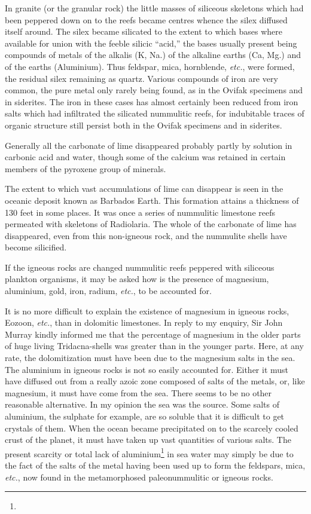 \documentclass[a4paper, 12pt, oneside]{article}
\begin{document}
In granite (or the granular rock) the little masses of siliceous skeletons which had been peppered down on to the reefs became centres whence the silex diffused itself around. The silex became silicated to the extent to which bases where available for union with the feeble silicic ``acid,'' the bases usually present being compounds of metals of the alkalis (K, Na.) of the alkaline earths (Ca, Mg.) and of the earths (Aluminium). Thus feldspar, mica, hornblende, \emph{etc.}, were formed, the residual silex remaining as quartz. Various compounds of iron are very common, the pure metal only rarely being found, as in the Ovifak specimens and in siderites. The iron in these cases has almost certainly been reduced from iron salts which had infiltrated the silicated nummulitic reefs, for indubitable traces of organic structure still persist both in the Ovifak specimens and in siderites.

Generally all the carbonate of lime disappeared probably partly by solution in carbonic acid and water, though some of the calcium was retained in certain members of the pyroxene group of minerals.

The extent to which vast accumulations of lime can disappear is seen in the oceanic deposit known as Barbados Earth. This formation attains a thickness of 130 feet in some places. It was once a series of nummulitic limestone reefs permeated with skeletons of Radiolaria. The whole of the carbonate of lime has disappeared, even from this non-igneous rock, and the nummulite shells have become silicified.

If the igneous rocks are changed nummulitic reefs peppered with siliceous plankton organisms, it may be asked how is the presence of magnesium, aluminium, gold, iron, radium, \emph{etc.}, to be accounted for.

It is no more difficult to explain the existence of magnesium in igneous rocks, Eozoon, \emph{etc.}, than in dolomitic limestones. In reply to my enquiry, Sir John Murray kindly informed me that the percentage of magnesium in the older parts of huge living Tridacna-shells was greater than in the younger parts. Here, at any rate, the dolomitization must have been due to the magnesium salts in the sea. The aluminium in igneous rocks is not so easily accounted for. Either it must have diffused out from a really azoic zone composed of salts of the metals, or, like magnesium, it must have come from the sea. There seems to be no other reasonable alternative. In my opinion the sea was the source. Some salts of aluminium, the sulphate for example, are so soluble that it is difficult to get crystals of them. When the ocean became precipitated on to the scarcely cooled crust of the planet, it must have taken up vast quantities of various salts. The present scarcity or total lack of aluminium\footnote{} in sea water may simply be due to the fact of the salts of the metal having been used up to form the feldspars, mica, \emph{etc.}, now found in the metamorphosed paleonummulitic or igneous rocks.
\end{document}
